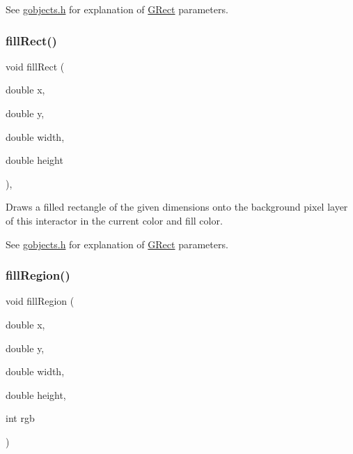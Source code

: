 See \mbox{\hyperlink{gobjects_8h_source}{gobjects.\+h}} for explanation of \mbox{\hyperlink{classGRect}{G\+Rect}} parameters. \mbox{\label{classGDrawingSurface_aac3ae7d3aee950de78eca0e108352254}} 
\subsubsection{\texorpdfstring{fill\+Rect()}{fillRect()}\hspace{0.1cm}{\footnotesize\ttfamily [2/2]}}
{\footnotesize\ttfamily void fill\+Rect (\begin{DoxyParamCaption}\item[{double}]{x,  }\item[{double}]{y,  }\item[{double}]{width,  }\item[{double}]{height }\end{DoxyParamCaption})\hspace{0.3cm}{\ttfamily [virtual]}, {\ttfamily [inherited]}}



Draws a filled rectangle of the given dimensions onto the background pixel layer of this interactor in the current color and fill color. 

See \mbox{\hyperlink{gobjects_8h_source}{gobjects.\+h}} for explanation of \mbox{\hyperlink{classGRect}{G\+Rect}} parameters. \mbox{\label{classGCanvas_af4146bdcb26135b739b9b4f13db03435}} 
\subsubsection{\texorpdfstring{fill\+Region()}{fillRegion()}\hspace{0.1cm}{\footnotesize\ttfamily [1/2]}}
{\footnotesize\ttfamily void fill\+Region (\begin{DoxyParamCaption}\item[{double}]{x,  }\item[{double}]{y,  }\item[{double}]{width,  }\item[{double}]{height,  }\item[{int}]{rgb }\end{DoxyParamCaption})\hspace{0.3cm}{\ttfamily [virtual]}}



